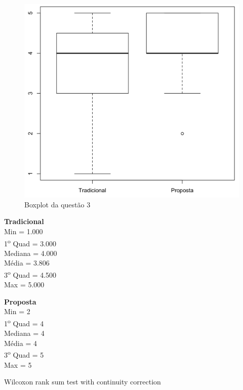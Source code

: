 \begin{figure}[htb]
  \caption{\label{fig:questao3-boxplot}Boxplot da questão 3}
  \begin{center}
      \includegraphics[scale=0.4]{./Figuras/questao3-boxplot.png}
  \end{center}
\end{figure}

\begin{multicols}{2}

\noindent\textbf{Tradicional}\\
Min = 1.000\\
1\textsuperscript{o} Quad = 3.000\\
Mediana = 4.000\\
Média = 3.806\\
3\textsuperscript{o} Quad = 4.500\\
Max = 5.000\\
\columnbreak

\noindent\textbf{Proposta}\\
Min = 2\\
1\textsuperscript{o} Quad = 4\\
Mediana = 4\\
Média = 4\\
3\textsuperscript{o} Quad = 5\\
Max = 5
\end{multicols}

Wilcoxon rank sum test with continuity correction

